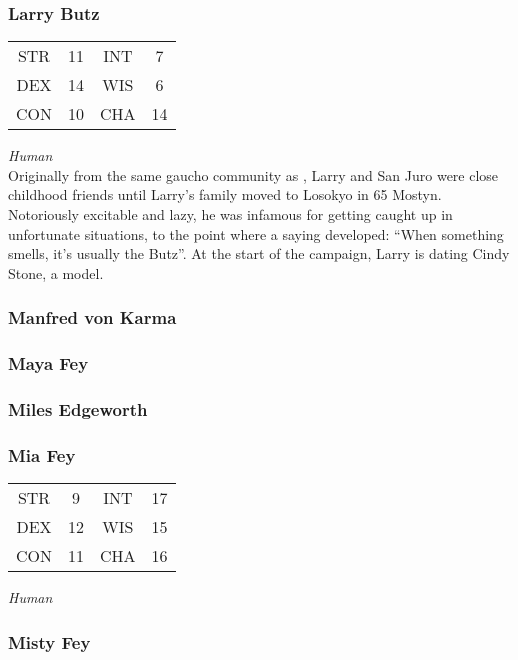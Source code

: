 \subsubsection{Larry Butz}
\label{people:larry}
\begin{center}
\begin{tabular}{c c|c c}
STR & 11 & INT & 7\\
DEX & 14 & WIS & 6 \\
CON & 10 & CHA & 14 \end{tabular}\end{center}
\textit{Human}\\
Originally from the same gaucho community as , Larry and San Juro were close childhood friends until Larry's family moved to Losokyo in 65 Mostyn. Notoriously excitable and lazy, he was infamous for getting caught up in unfortunate situations, to the point where a saying developed: ``When something smells, it's usually the Butz''. At the start of the campaign, Larry is dating Cindy Stone, a model.

\subsubsection{Manfred von Karma}
\label{people:mvonkarma}

\subsubsection{Maya Fey}
\label{people:mayafey}

\subsubsection{Miles Edgeworth}
\label{people:miles}

\subsubsection{Mia Fey}
\label{people:miafey}
\begin{center}
\begin{tabular}{c c|c c}
STR & 9 & INT & 17\\
DEX & 12 & WIS & 15 \\
CON & 11 & CHA & 16 \end{tabular}\end{center}
\textit{Human}\\



\subsubsection{Misty Fey}
\label{people:mistyfey}

